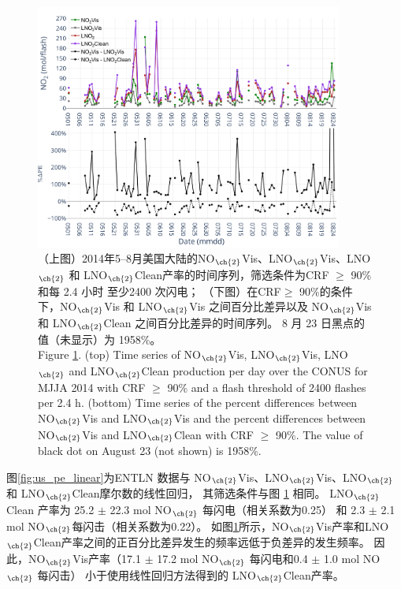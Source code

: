 \begin{figure}[H]
\centering
\includegraphics[width=0.9\textwidth]{./figures/us_pe_timeseries.png}
\caption{（上图）2014年5--8月美国大陆的NO$_{\ch{2}}$Vis、LNO$_{\ch{2}}$Vis、LNO$_{\ch{2}}$ 和 LNO$_{\ch{2}}$Clean产率的时间序列，筛选条件为CRF $\geq$ 90\% 和每 2.4 小时 至少2400 次闪电；
（下图）在CRF$\geq$ 90\%的条件下，NO$_{\ch{2}}$Vis 和 LNO$_{\ch{2}}$Vis 之间百分比差异以及 NO$_{\ch{2}}$Vis 和 LNO$_{\ch{2}}$Clean 之间百分比差异的时间序列。
8 月 23 日黑点的值（未显示）为 1958\%。\\
Figure \ref{fig:us_pe_timeseries}. (top) Time series of NO$_{\ch{2}}$Vis, LNO$_{\ch{2}}$Vis, LNO$_{\ch{2}}$ and LNO$_{\ch{2}}$Clean production per day over the CONUS for MJJA 2014 with CRF $\geq$ 90\% and a flash threshold of 2400 flashes per 2.4 h.
(bottom) Time series of the percent differences between NO$_{\ch{2}}$Vis and LNO$_{\ch{2}}$Vis and the percent differences between NO$_{\ch{2}}$Vis and LNO$_{\ch{2}}$Clean with CRF $\geq$ 90\%.
The value of black dot on August 23 (not shown) is 1958\%.}
\label{fig:us_pe_timeseries}
\end{figure}


图\ref{fig:us_pe_linear}为ENTLN 数据与 NO$_{\ch{2}}$Vis、LNO$_{\ch{2}}$Vis、LNO$_{\ch{2}}$ 和 LNO$_{\ch{2}}$Clean摩尔数的线性回归，
其筛选条件与图 \ref{fig:us_pe_timeseries} 相同。
LNO$_{\ch{2}}$Clean 产率为 25.2 $\pm$ 22.3 mol NO$_{\ch{2}}$ 每闪电（相关系数为0.25）
和 2.3 $\pm$ 2.1 mol NO$_{\ch{2}}$每闪击（相关系数为0.22）。
如图\ref{fig:us_pe_timeseries}所示，NO$_{\ch{2}}$Vis产率和LNO$_{\ch{2}}$Clean产率之间的正百分比差异发生的频率远低于负差异的发生频率。
因此，NO$_{\ch{2}}$Vis产率（17.1 $\pm$ 17.2 mol NO$_{\ch{2}}$ 每闪电和0.4 $\pm$ 1.0 mol NO$_{\ch{2}}$ 每闪击）
小于使用线性回归方法得到的 LNO$_{\ch{2}}$Clean产率。


